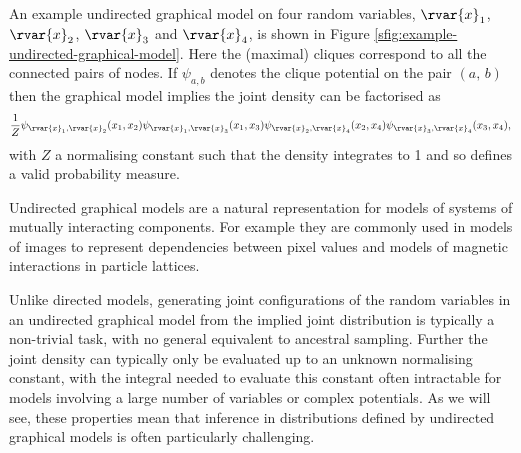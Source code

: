 An example undirected graphical model on four random variables, $\rvar{x}_1$, $\rvar{x}_2$, $\rvar{x}_3$ and $\rvar{x}_4$, is shown in Figure \ref{sfig:example-undirected-graphical-model}. Here the (maximal) cliques correspond to all the connected pairs of nodes. If $\psi_{a,b}$ denotes the clique potential on the pair $(a,\,b)$ then the graphical model implies the joint density can be factorised as
\begin{equation}\label{eq:example-undirected-graphical-model-factorisation}
\begin{split}
  \frac{1}{Z} 
  \psi_{\rvar{x}_1,\rvar{x}_2}(x_1,x_2)
  \psi_{\rvar{x}_1,\rvar{x}_3}(x_1,x_3)
  \psi_{\rvar{x}_2,\rvar{x}_4}(x_2,x_4)
  \psi_{\rvar{x}_3,\rvar{x}_4}(x_3,x_4),
\end{split}
\end{equation}
with $Z$ a normalising constant such that the density integrates to 1 and so defines a valid probability measure.

Undirected graphical models are a natural representation for models of systems of mutually interacting components. For example they are commonly used in models of images to represent dependencies between pixel values and models of magnetic interactions in particle lattices. 

Unlike directed models, generating joint configurations of the random variables in an undirected graphical model from the implied joint distribution is typically a non-trivial task, with no general equivalent to ancestral sampling. Further the joint density can typically only be evaluated up to an unknown normalising constant, with the integral needed to evaluate this constant often intractable for models involving a large number of variables or complex potentials. As we will see, these properties mean that inference in distributions defined by undirected graphical models is often particularly challenging.

